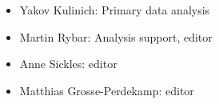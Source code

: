 
\begin{itemize}
\item Yakov Kulinich: Primary data analysis
\item Martin Rybar: Analysis support, editor
\item Anne Sickles: editor
\item Matthias Grosse-Perdekamp: editor
\end{itemize}

